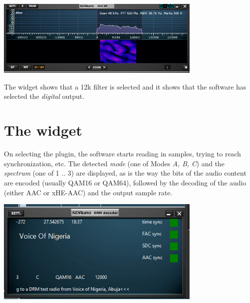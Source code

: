 \documentclass[10pt]{article}
\begin{document}
\includegraphics[width=100mm]{drm-small-spectrum.png}

The widget shows that a 12k filter is selected and it shows that the
software has selected the {\em digital} output.

\section{The widget}
On selecting the plugin, the software starts reading in samples,
trying to reach synchronization, etc.
The detected {\em mode} (one of Modes {\em A, B, C})  and the {\em spectrum}
(one of 1 .. 3) are displayed, as is the way the bits of the
audio content are encoded (usually QAM16 or QAM64), followed by
the decoding of the audio (either AAC or xHE-AAC) and the output
sample rate.
\par

\includegraphics[width=100mm]{drm-decoder-widget.png}
\end{document}
